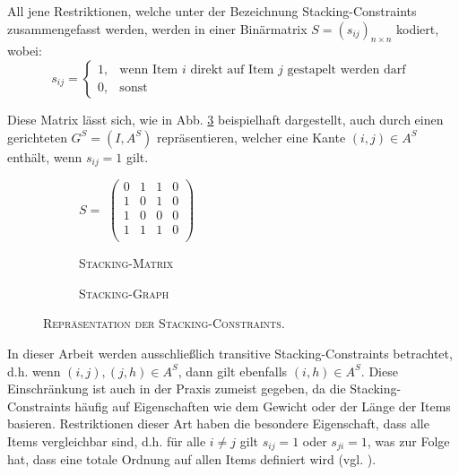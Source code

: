 All jene Restriktionen, welche unter der Bezeichnung Stacking-Constraints zusammengefasst werden,
werden in einer Binärmatrix $S = (s_{ij})_{n \times n}$ kodiert, wobei:
\[
    s_{ij} =
\begin{cases}
    1, & \text{wenn Item $i$ direkt auf Item $j$ gestapelt werden darf }\\
    0, & \text{sonst}
\end{cases}
\]

Diese Matrix lässt sich, wie in Abb. \ref{fig:matrix_to_graph} beispielhaft dargestellt, auch durch einen
gerichteten  $G^S = (I, A^S)$ repräsentieren, welcher eine Kante $(i, j) \in A^S$ enthält,
wenn $s_{ij} = 1$ gilt.
\begin{figure}[H]
  \begin{subfigure}[b]{0.5\textwidth}
  \centering
    $S =$
    $\left(
    \begin{array}{rrrr}
    0 & 1 & 1 & 0 \\
    1 & 0 & 1 & 0 \\
    1 & 0 & 0 & 0 \\
    1 & 1 & 1 & 0 \\
    \end{array} \right) $
    \caption{\textsc{Stacking-Matrix}}
    \label{fig:constraint_matrix}
  \end{subfigure}
  \hfill
  \begin{subfigure}[b]{0.5\textwidth}
  \centering
    \caption{\textsc{Stacking-Graph}}
    \label{fig:resulting_graph}
  \end{subfigure}
  \caption{\textsc{Repräsentation der Stacking-Constraints.}}
  \label{fig:matrix_to_graph}
\end{figure}
In dieser Arbeit werden ausschließlich transitive Stacking-Constraints betrachtet, d.h.
wenn $(i, j), (j, h) \in A^S$, dann gilt ebenfalls $(i, h) \in A^S$.
Diese Einschränkung ist auch in der Praxis zumeist gegeben, da die Stacking-Constraints häufig auf Eigenschaften wie dem Gewicht oder der Länge der Items basieren. Restriktionen dieser Art haben die besondere Eigenschaft, dass alle Items vergleichbar sind, d.h. für alle $i \neq j$ gilt $s_{ij} = 1$ oder $s_{ji} = 1$, was zur Folge hat,
dass eine totale Ordnung auf allen Items definiert wird (vgl. \citet{Bruns2015}).

